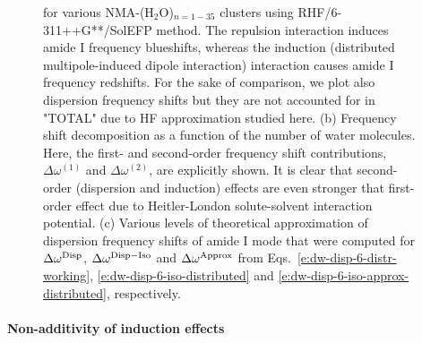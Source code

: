 \documentclass[a4paper,titlepage,twoside,fleqn,12pt]{book}
\begin{document}
\begin{refsection}
\begin{figure}[t!]
{for various NMA-(H$_2$O)$_{n = 1-35}$ clusters using 
RHF/6-311++G**/SolEFP method. The repulsion interaction induces amide I
frequency blueshifts, whereas the induction (distributed multipole\hyp{}induced
dipole interaction) interaction causes amide I frequency redshifts.
For the sake of comparison, we plot also dispersion frequency shifts
but they are not accounted for in "TOTAL" due to HF approximation studied here.
(b) Frequency shift decomposition as a function of the number of water molecules.
Here, the first\hyp{} and second\hyp{}order frequency shift contributions,
$\Delta\omega^{(1)}$ and $\Delta\omega^{(2)}$, are explicitly shown. It is clear
that second\hyp{}order (dispersion and induction) effects are even stronger 
that first\hyp{}order effect due to Heitler\hyp{}London solute\hyp{}solvent
interaction potential.
(c) Various levels of theoretical approximation of dispersion frequency
shifts of amide I mode that were computed for $\Delta\omega^{\rm Disp}$,
$\Delta\omega^{\rm Disp-Iso}$ and $\Delta\omega^{\rm Approx}$ 
from Eqs.~\eqref{e:dw-disp-6-distr-working}, \eqref{e:dw-disp-6-iso-distributed} 
and \eqref{e:dw-disp-6-iso-approx-distributed}, respectively.
\label{f:nma-water-rhf}}
\end{figure}
%

\paragraph{Non\hyp{}additivity of induction effects}


\end{refsection}
\end{document}
